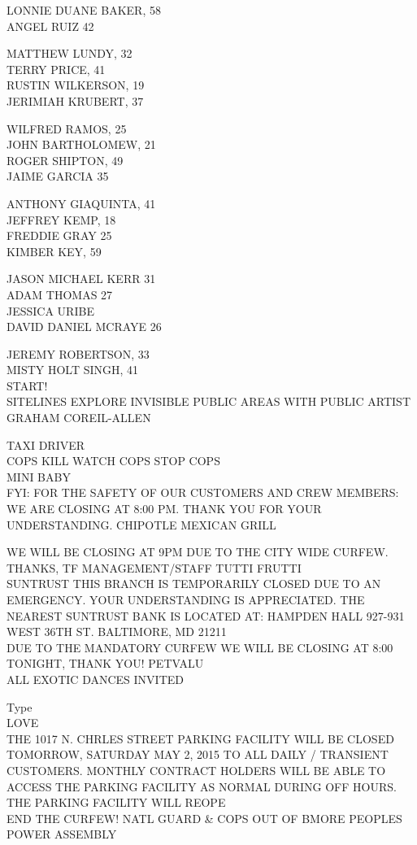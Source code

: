 \documentclass[10pt,letterpaper]{article}
\begin{document}
LONNIE DUANE BAKER, 58\\
ANGEL RUIZ 42

MATTHEW LUNDY, 32\\
TERRY PRICE, 41\\
RUSTIN WILKERSON, 19\\
JERIMIAH KRUBERT, 37

WILFRED RAMOS, 25\\
JOHN BARTHOLOMEW, 21\\
ROGER SHIPTON, 49\\
JAIME GARCIA 35

ANTHONY GIAQUINTA, 41\\
JEFFREY KEMP, 18\\
FREDDIE GRAY 25\\
KIMBER KEY, 59

JASON MICHAEL KERR 31\\
ADAM THOMAS 27\\
JESSICA URIBE\\
DAVID DANIEL MCRAYE 26

JEREMY ROBERTSON, 33\\
MISTY HOLT SINGH, 41\\
START!\\
SITELINES EXPLORE INVISIBLE PUBLIC AREAS WITH PUBLIC ARTIST GRAHAM COREIL{-}ALLEN

TAXI DRIVER\\
COPS KILL WATCH COPS STOP COPS\\
MINI BABY\\
FYI: FOR THE SAFETY OF OUR CUSTOMERS AND CREW MEMBERS: WE ARE CLOSING AT 8:00 PM.  THANK YOU FOR YOUR UNDERSTANDING.  CHIPOTLE MEXICAN GRILL

WE WILL BE CLOSING AT 9PM DUE TO THE CITY WIDE CURFEW.  THANKS, TF MANAGEMENT/STAFF  TUTTI FRUTTI\\
SUNTRUST THIS BRANCH IS TEMPORARILY CLOSED DUE TO AN EMERGENCY.  YOUR UNDERSTANDING IS APPRECIATED.  THE NEAREST SUNTRUST BANK IS LOCATED AT: HAMPDEN HALL 927{-}931 WEST 36TH ST. BALTIMORE, MD 21211\\
DUE TO THE MANDATORY CURFEW WE WILL BE CLOSING AT 8:00 TONIGHT, THANK YOU!  PETVALU\\
ALL EXOTIC DANCES INVITED

Type\\
LOVE\\
THE 1017 N. CHRLES STREET PARKING FACILITY WILL BE CLOSED TOMORROW, SATURDAY MAY 2, 2015 TO ALL DAILY / TRANSIENT CUSTOMERS.  MONTHLY CONTRACT HOLDERS WILL BE ABLE TO ACCESS THE PARKING FACILITY AS NORMAL DURING OFF HOURS.  THE PARKING FACILITY WILL REOPE\\
END THE CURFEW!  NATL GUARD \& COPS OUT OF BMORE PEOPLES POWER ASSEMBLY
\end{document}
